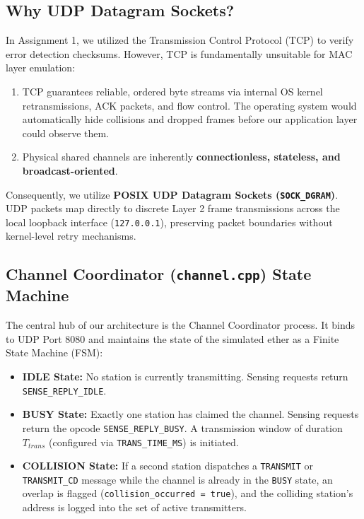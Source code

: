\documentclass[12pt, a4paper]{article}
\begin{document}
\subsection{Why UDP Datagram Sockets?}
In Assignment 1, we utilized the Transmission Control Protocol (TCP) to verify error detection checksums. However, TCP is fundamentally unsuitable for MAC layer emulation:
\begin{enumerate}
    \item TCP guarantees reliable, ordered byte streams via internal OS kernel retransmissions, ACK packets, and flow control. The operating system would automatically hide collisions and dropped frames before our application layer could observe them.
    \item Physical shared channels are inherently \textbf{connectionless, stateless, and broadcast-oriented}. 
\end{enumerate}
Consequently, we utilize \textbf{POSIX UDP Datagram Sockets (\texttt{SOCK\_DGRAM})}. UDP packets map directly to discrete Layer 2 frame transmissions across the local loopback interface (\texttt{127.0.0.1}), preserving packet boundaries without kernel-level retry mechanisms.

\subsection{Channel Coordinator (\texttt{channel.cpp}) State Machine}
The central hub of our architecture is the Channel Coordinator process. It binds to UDP Port 8080 and maintains the state of the simulated ether as a Finite State Machine (FSM):
\begin{itemize}
    \item \textbf{IDLE State:} No station is currently transmitting. Sensing requests return \texttt{SENSE\_REPLY\_IDLE}.
    \item \textbf{BUSY State:} Exactly one station has claimed the channel. Sensing requests return the opcode \texttt{SENSE\_\allowbreak REPLY\_\allowbreak BUSY}. A transmission window of duration $T_{trans}$ (configured via \texttt{TRANS\_TIME\_MS}) is initiated.
    \item \textbf{COLLISION State:} If a second station dispatches a \texttt{TRANSMIT} or \texttt{TRANSMIT\_CD} message while the channel is already in the \texttt{BUSY} state, an overlap is flagged (\texttt{collision\_occurred = true}), and the colliding station's address is logged into the set of active transmitters.
\end{itemize}
\end{document}
